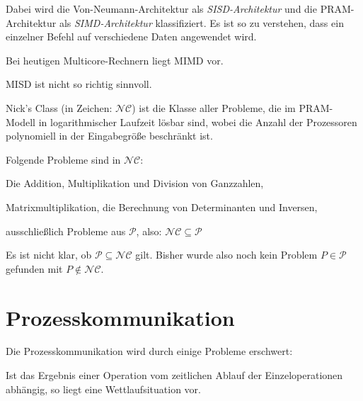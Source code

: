 Dabei wird die Von-Neumann-Architektur als \textit{SISD-Architektur} und die
PRAM-Architektur als \textit{SIMD-Architektur} klassifiziert. Es ist so zu
verstehen, dass ein einzelner Befehl auf verschiedene Daten angewendet wird.

Bei heutigen Multicore-Rechnern liegt MIMD vor.

MISD ist nicht so richtig sinnvoll.

\begin{definition}%
    Nick's Class (in Zeichen: $\mathcal{NC}$) ist die Klasse aller Probleme,
    die im PRAM-Modell in logarithmischer Laufzeit lösbar sind, wobei die
    Anzahl der Prozessoren polynomiell in der Eingabegröße beschränkt ist.
\end{definition}

\begin{beispiel}%
    Folgende Probleme sind in $\mathcal{NC}$:
    \begin{bspenum}
        \item Die Addition, Multiplikation und Division von Ganzzahlen,
        \item Matrixmultiplikation, die Berechnung von Determinanten und Inversen,
        \item ausschließlich Probleme aus $\mathcal{P}$, also: $\mathcal{NC} \subseteq \mathcal{P}$
    \end{bspenum}

    Es ist nicht klar, ob $\mathcal{P} \subseteq \mathcal{NC}$ gilt. Bisher 
    wurde also noch kein Problem $P \in \mathcal{P}$ gefunden mit $P \notin \mathcal{NC}$.
\end{beispiel}

\section{Prozesskommunikation}
Die Prozesskommunikation wird durch einige Probleme erschwert:

\begin{definition}[Wettlaufsituation]%
    Ist das Ergebnis einer Operation vom zeitlichen Ablauf der Einzeloperationen
    abhängig, so liegt eine Wettlaufsituation vor.
\end{definition}

